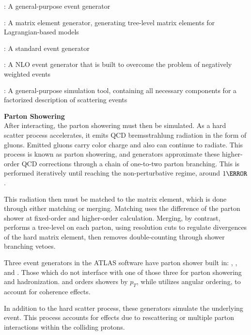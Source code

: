 \begin{description}
    \item \HERWIGpp: A general-purpose event generator \cite{herwigpp}
    \item \MADGRAPH: A matrix element generator, generating tree-level matrix elements for Lagrangian-based models \cite{mg5}
    \item \PYTHIA: A standard event generator \cite{pythia8.2}
    \item \POWHEG: A \gls{NLO} event generator that is built to overcome the problem of negatively weighted events \cite{powheg} %
    \item \SHERPA: A general-purpose simulation tool, containing all necessary components for a factorized description of scattering events \cite{sherpa2.2}
\end{description}

\noindent\textbf{Parton Showering}\\ %
\indent After interacting, the parton showering must then be simulated. As a hard scatter process accelerates, it emits \gls{QCD} bremsstrahlung radiation in the form of gluons. Emitted gluons carry color charge and also can continue to radiate. This process is known as parton showering, and generators approximate these higher-order \gls{QCD} corrections through a chain of one-to-two parton branching. This is performed iteratively until reaching the non-perturbative regime, around $\unit{1}{\GeV}$.

This radiation then must be matched to the matrix element, which is done through either matching or merging. Matching uses the difference of the parton shower at fixed-order and higher-order calculation. Merging, by contrast, performs a tree-level on each parton, using resolution cuts to regulate divergences of the hard matrix element, then removes double-counting through shower branching vetoes.

Three event generators in the ATLAS software have parton shower built in: \PYTHIA, \HERWIG, and \SHERPA. Those which do not interface with one of those three for parton showering and hadronization. \PYTHIA and \SHERPA orders showers by $p_{T}$, while \HERWIG utilizes angular ordering, to account for coherence effects. 

In addition to the hard scatter process, these generators simulate the underlying event. This process accounts for effects due to rescattering or multiple parton interactions within the colliding protons.

